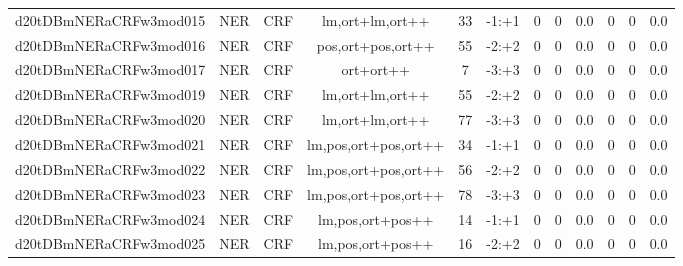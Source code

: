\documentclass[a4paper]{article}
\begin{document}
\begin{landscape}
\begin{center}
\begin{tabular}{ |c|c|c|c|c|c|c|c|c|c|c|c|}
 	

 
 	
 	\small{ d20tDBmNERaCRFw3mod015 } & \small{ NER} & \small{  CRF }  & lm,ort+lm,ort++  &  33 &  \small{  -1:+1 }  &  0 & 0 & 0.0  &  0 & 0 & 0.0 \\
 	

 
 	
 	\small{ d20tDBmNERaCRFw3mod016 } & \small{ NER} & \small{  CRF }  & pos,ort+pos,ort++  &  55 &  \small{  -2:+2 }  &  0 & 0 & 0.0  &  0 & 0 & 0.0 \\
 	

 
 	
 	\small{ d20tDBmNERaCRFw3mod017 } & \small{ NER} & \small{  CRF }  & ort+ort++  &  7 &  \small{  -3:+3 }  &  0 & 0 & 0.0  &  0 & 0 & 0.0 \\
 	

 
 	
 	\small{ d20tDBmNERaCRFw3mod019 } & \small{ NER} & \small{  CRF }  & lm,ort+lm,ort++  &  55 &  \small{  -2:+2 }  &  0 & 0 & 0.0  &  0 & 0 & 0.0 \\
 	

 
 	
 	\small{ d20tDBmNERaCRFw3mod020 } & \small{ NER} & \small{  CRF }  & lm,ort+lm,ort++  &  77 &  \small{  -3:+3 }  &  0 & 0 & 0.0  &  0 & 0 & 0.0 \\
 	

 
 	
 	\small{ d20tDBmNERaCRFw3mod021 } & \small{ NER} & \small{  CRF }  & lm,pos,ort+pos,ort++  &  34 &  \small{  -1:+1 }  &  0 & 0 & 0.0  &  0 & 0 & 0.0 \\
 	

 
 	
 	\small{ d20tDBmNERaCRFw3mod022 } & \small{ NER} & \small{  CRF }  & lm,pos,ort+pos,ort++  &  56 &  \small{  -2:+2 }  &  0 & 0 & 0.0  &  0 & 0 & 0.0 \\
 	

 
 	
 	\small{ d20tDBmNERaCRFw3mod023 } & \small{ NER} & \small{  CRF }  & lm,pos,ort+pos,ort++  &  78 &  \small{  -3:+3 }  &  0 & 0 & 0.0  &  0 & 0 & 0.0 \\
 	

 
 	
 	\small{ d20tDBmNERaCRFw3mod024 } & \small{ NER} & \small{  CRF }  & lm,pos,ort+pos++  &  14 &  \small{  -1:+1 }  &  0 & 0 & 0.0  &  0 & 0 & 0.0 \\
 	

 
 	
 	\small{ d20tDBmNERaCRFw3mod025 } & \small{ NER} & \small{  CRF }  & lm,pos,ort+pos++  &  16 &  \small{  -2:+2 }  &  0 & 0 & 0.0  &  0 & 0 & 0.0 \\
 	


\end{tabular}
\end{center}
\end{landscape}
\end{document}
